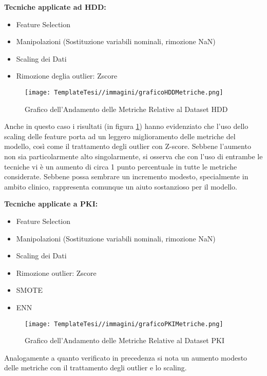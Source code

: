 \begin{flushleft}
\textbf{Tecniche applicate ad HDD:}
\begin{itemize}
    \item Feature Selection
    \item Manipolazioni (Sostituzione variabili nominali, rimozione NaN)
    \item Scaling dei Dati
    \item Rimozione deglia outlier: Zscore
\end{itemize}




\begin{figure}[H]
    \centering
    \texttt{[image: TemplateTesi//immagini/graficoHDDMetriche.png]}
    \caption{Grafico dell'Andamento delle Metriche Relative al Dataset HDD}
    \label{fig:graficoandamentoHDD}
\end{figure}

Anche in questo caso i risultati (in figura \ref{fig:graficoandamentoHDD}) hanno evidenziato che l'uso dello scaling delle feature porta ad un leggero miglioramento delle metriche del modello, così come il trattamento degli outlier con Z-score. Sebbene l'aumento non sia particolarmente alto singolarmente, si osserva che con l'uso di entrambe le tecniche vi è un aumento di circa 1 punto percentuale in tutte le metriche considerate. Sebbene possa sembrare un incremento modesto, specialmente in ambito clinico, rappresenta comunque un aiuto sostanzioso per il modello.

\textbf{Tecniche applicate a PKI:}
\begin{itemize}
    \item Feature Selection
    \item Manipolazioni (Sostituzione variabili nominali, rimozione NaN)
    \item Scaling dei Dati
    \item Rimozione outlier: Zscore
    \item SMOTE
    \item ENN
\end{itemize}


\begin{figure}[H]
    \centering
    \texttt{[image: TemplateTesi//immagini/graficoPKIMetriche.png]}
    \caption{Grafico dell'Andamento delle Metriche Relative al Dataset PKI}
    \label{fig:graficoandamentoPKI}
\end{figure}
Analogamente a quanto verificato in precedenza si nota un aumento modesto delle metriche  con il trattamento degli outlier e lo scaling.


\end{flushleft}
